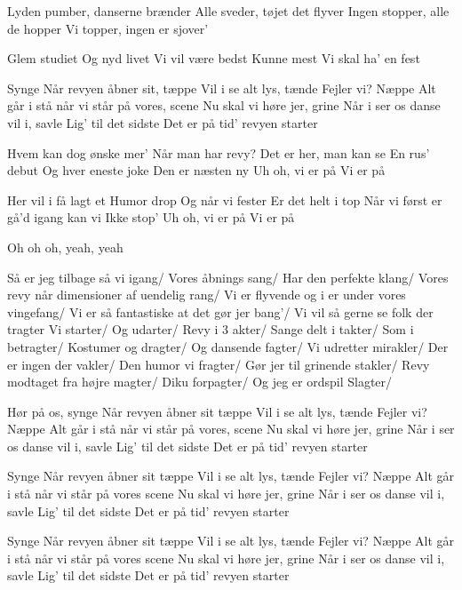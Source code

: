 \documentclass[a4paper,11pt]{article}
\begin{document}
\begin{song}
 Lyden pumber, danserne brænder
Alle sveder, tøjet det flyver
Ingen stopper, alle de hopper
Vi topper, ingen er sjover'


 Glem studiet
Og nyd livet
Vi vil være bedst
Kunne mest
 Vi skal ha' en 
 fest


 Synge
Når revyen åbner sit, tæppe
Vil i se alt lys, tænde
Fejler vi? Næppe
Alt går i stå når vi står på vores, scene
Nu skal vi høre jer, grine
Når i ser os danse vil i, savle
Lig' til det sidste
Det er på tid' revyen starter




 Hvem kan dog ønske mer'
 Når man har revy?
 Det er her, man kan se
 En rus' debut
 Og hver eneste joke
 Den er næsten ny
Uh oh, vi er på
 Vi er på

 Her vil i få lagt et
 Humor drop
Og når vi fester
Er det helt i top
 Når vi først er gå'd igang kan vi 
Ikke stop'
Uh oh, vi er på
 Vi er på

 Oh oh oh, yeah, yeah


 Så er jeg tilbage så vi igang/ Vores åbnings sang/
Har den perfekte klang/
Vores revy når dimensioner af uendelig rang/
Vi er flyvende og i er under vores vingefang/
Vi er så fantastiske at det gør jer bang'/
Vi vil så gerne se folk der tragter
Vi starter/ Og udarter/ Revy i 3 akter/
Sange delt i takter/ Som i betragter/
Kostumer og dragter/ Og dansende fagter/
Vi udretter mirakler/ Der er ingen der vakler/
Den humor vi fragter/ Gør jer til grinende stakler/
Revy modtaget fra højre magter/ Diku forpagter/
Og jeg er ordspil Slagter/


  Hør på os, synge
Når revyen åbner sit tæppe
Vil i se alt lys, tænde
Fejler vi? Næppe
Alt går i stå når vi står på vores, scene
Nu skal vi høre jer, grine
Når i ser os danse vil i, savle
Lig' til det sidste
Det er på tid' revyen starter

  Synge
Når revyen åbner sit tæppe
Vil i se alt lys, tænde
Fejler vi? Næppe
Alt går i stå når vi står på vores scene
Nu skal vi høre jer, grine
Når i ser os danse vil i, savle
Lig' til det sidste
Det er på tid' revyen starter

  Synge
Når revyen åbner sit tæppe
Vil i se alt lys, tænde
Fejler vi? Næppe
Alt går i stå når vi står på vores scene
Nu skal vi høre jer, grine
Når i ser os danse vil i, savle
Lig' til det sidste
 Det er på tid' revyen starter
\end{song}
\end{document}
